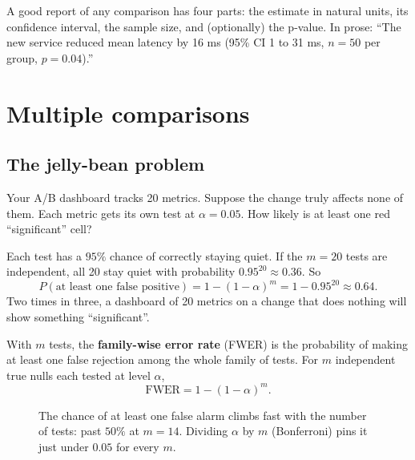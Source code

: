 A good report of any comparison has four parts: the estimate in natural units,
its confidence interval, the sample size, and (optionally) the p-value. In
prose: ``The new service reduced mean latency by 16 ms (95\% CI 1 to 31 ms,
$n=50$ per group, $p=0.04$).''

\section{Multiple comparisons}
\label{sec:pitfalls-multiple}

\subsection{The jelly-bean problem}

Your A/B dashboard tracks 20 metrics. Suppose the change truly affects none of
them. Each metric gets its own test at $\alpha=0.05$. How likely is at least one
red ``significant'' cell?

Each test has a $95\%$ chance of correctly staying quiet. If the $m=20$ tests are
independent, all 20 stay quiet with probability $0.95^{20}\approx 0.36$. So
\[
  P(\text{at least one false positive}) = 1-(1-\alpha)^m = 1-0.95^{20}\approx 0.64.
\]
Two times in three, a dashboard of 20 metrics on a change that does nothing will
show something ``significant''.

\begin{definition}
With $m$ tests, the \textbf{family-wise error rate} (FWER) is the probability of
making at least one false rejection among the whole family of tests. For $m$
independent true nulls each tested at level $\alpha$,
\[
  \mathrm{FWER} = 1-(1-\alpha)^m.
\]
\end{definition}

\begin{figure}[H]
\centering
{}
\caption{The chance of at least one false alarm climbs fast with the number of
tests: past $50\%$ at $m=14$. Dividing $\alpha$ by $m$ (Bonferroni) pins it just
under $0.05$ for every $m$.}
\label{fig:pitfalls-fwer}
\end{figure}

